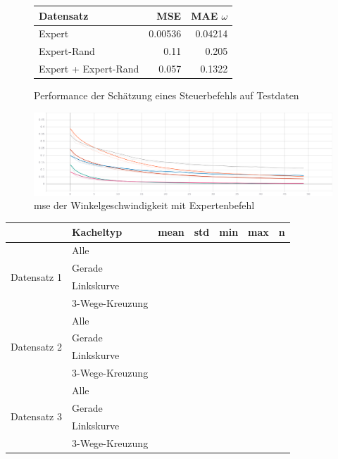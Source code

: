 \begin{figure}[H]
	\centering
	\begin{tabular}[t]{|l|r|r|}
		\hline
		Datensatz & MSE & MAE $\omega$ \\
		\hline
		Expert & 0.00536 & 0.04214 \\
		\hline
		Expert-Rand & 0.11 & 0.205 \\
		\hline
		Expert + Expert-Rand & 0.057 & 0.1322 \\
		\hline
	\end{tabular}
	\caption{Performance der Schätzung eines Steuerbefehls auf Testdaten}
	\label{expert-performance}
\end{figure}

\begin{figure}[H]
	\centering
	\includegraphics[width=\linewidth]{kapitel5/images/expert/Loss-expert.png}
	\caption{\acs{mse} der Winkelgeschwindigkeit mit Expertenbefehl}
	\label{expert-mse-omega}
\end{figure}


\begin{tabular}[t]{|c|l|l|l|l|l|l|}
	\hline
	 & \textbf{Kacheltyp} & \textbf{mean} & \textbf{std} & \textbf{min} & \textbf{max} & \textbf{n} \\
	\hline
	\multirow{4}{*}{Datensatz 1} 
	& Alle & & & & & \\
	\cline{2-7}
	& Gerade & & & & & \\
	\cline{2-7}
	& Linkskurve & & & & & \\
	\cline{2-7}
	& 3-Wege-Kreuzung & & & & & \\
	\hline
	\multirow{4}{*}{Datensatz 2} 
	& Alle & & & & & \\
	\cline{2-7}
	& Gerade & & & & & \\
	\cline{2-7}
	& Linkskurve & & & & & \\
	\cline{2-7}
	& 3-Wege-Kreuzung & & & & & \\
	\hline
	\multirow{4}{*}{Datensatz 3} 
	& Alle & & & & & \\
	\cline{2-7}
	& Gerade & & & & & \\
	\cline{2-7}
	& Linkskurve & & & & & \\
	\cline{2-7}
	& 3-Wege-Kreuzung & & & & & \\
	\hline
\end{tabular}